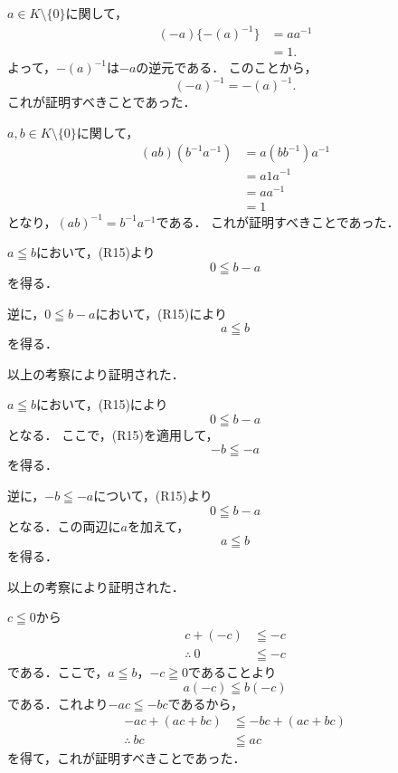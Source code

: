 \begin{tproof}
    $ a \in K \setminus \{ 0 \} $に関して，
    \begin{align*}
        (-a) \{ -(a)^{-1} \} & = aa^{-1} \\
                             & =1.
    \end{align*}
    よって，$-(a)^{-1}$は$-a$の逆元である．
    このことから，
    \[
        (-a)^{-1} = -(a)^{-1}.
    \]
    これが証明すべきことであった．
\end{tproof}
\begin{tproof}
    $ a ,b\in K \setminus \{ 0 \} $に関して，
    \begin{align*}
        (ab) (b^{-1} a^{-1}) & = a (bb^{-1}) a^{-1} \\
                             & = a1a^{-1}           \\
                             & = aa^{-1}            \\
                             & = 1
    \end{align*}
    となり，$(ab)^{-1} = b^{-1} a^{-1}$である．
    これが証明すべきことであった．
\end{tproof}
%


\begin{tproof}
    $a \leqq b$において，(R15)より
    \[
        0 \leqq b-a
    \]
    を得る．

    逆に，$0 \leqq b-a$において，(R15)により
    \[
        a \leqq b
    \]
    を得る．

    以上の考察により証明された．
\end{tproof}

\begin{tproof}
    $a \leqq b$において，(R15)により
    \[
        0 \leqq b-a
    \]
    となる．
    ここで，(R15)を適用して，
    \[
        -b \leqq -a
    \]
    を得る．

    逆に，$-b\leqq -a$について，(R15)より
    \[
        0 \leqq b -a
    \]
    となる．この両辺に$a$を加えて，
    \[
        a \leqq b
    \]
    を得る．

    以上の考察により証明された．
\end{tproof}



\begin{tproof}
    $c \leqq 0$から
    \begin{align*}
        c+(-c)         & \leqq -c \\
        \therefore ~ 0 & \leqq -c
    \end{align*}
    である．ここで，$a \leqq b$，$-c \geqq 0$であることより
    \[
        a(-c) \leqq b (-c)
    \]
    である．これより$ -ac \leqq -bc$であるから，
    \begin{align*}
        -ac + (ac+bc)   & \leqq -bc +(ac+bc) \\
        \therefore ~ bc & \leqq ac
    \end{align*}
    を得て，これが証明すべきことであった．
\end{tproof}

